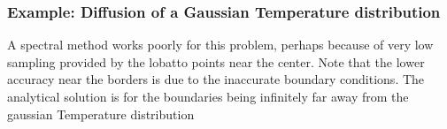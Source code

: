 \documentclass[11pt]{article}
\begin{document}
    \subsubsection{Example: Diffusion of a Gaussian Temperature
distribution}\label{example-diffusion-of-a-gaussian-temperature-distribution}

A spectral method works poorly for this problem, perhaps because of very
low sampling provided by the lobatto points near the center. Note that
the lower accuracy near the borders is due to the inaccurate boundary
conditions. The analytical solution is for the boundaries being
infinitely far away from the gaussian Temperature distribution




    \begin{center}
    \end{center}
    { \hspace*{\fill} \\}
    

    
    
    
    
\end{document}
